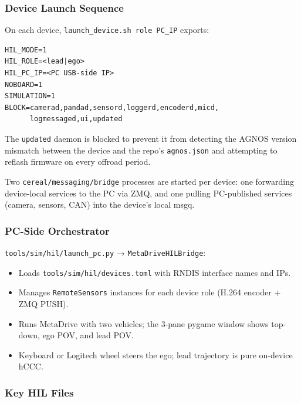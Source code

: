 \documentclass[12pt]{article}
\begin{document}
\subsubsection{Device Launch Sequence}

On each device, \texttt{launch\_device.sh \textlangle{}role\textrangle{} \textlangle{}PC\_IP\textrangle{}} exports:

\begin{verbatim}
HIL_MODE=1
HIL_ROLE=<lead|ego>
HIL_PC_IP=<PC USB-side IP>
NOBOARD=1
SIMULATION=1
BLOCK=camerad,pandad,sensord,loggerd,encoderd,micd,
      logmessaged,ui,updated
\end{verbatim}

The \texttt{updated} daemon is blocked to prevent it from detecting the AGNOS version mismatch between the device and the repo's \texttt{agnos.json} and attempting to reflash firmware on every offroad period.

Two \texttt{cereal/messaging/bridge} processes are started per device: one forwarding device-local services to the PC via ZMQ, and one pulling PC-published services (camera, sensors, CAN) into the device's local msgq.

\subsubsection{PC-Side Orchestrator}

\texttt{tools/sim/hil/launch\_pc.py} → \texttt{MetaDriveHILBridge}:

\begin{itemize}
  \item Loads \texttt{tools/sim/hil/devices.toml} with RNDIS interface names and IPs.
  \item Manages \texttt{RemoteSensors} instances for each device role (H.264 encoder + ZMQ PUSH).
  \item Runs MetaDrive with two vehicles; the 3-pane pygame window shows top-down, ego POV, and lead POV.
  \item Keyboard or Logitech wheel steers the ego; lead trajectory is pure on-device hCCC.
\end{itemize}

\subsubsection{Key HIL Files}
\end{document}

